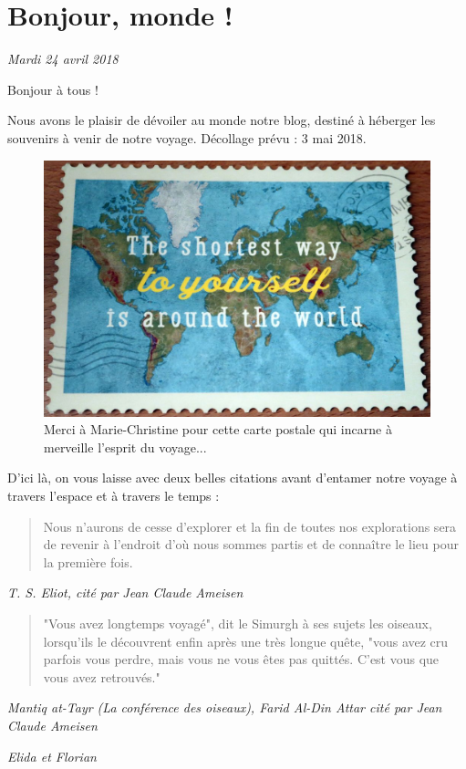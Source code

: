 \hypertarget{bonjour-monde}{%
\section{Bonjour, monde !}\label{bonjour-monde}}

\emph{Mardi 24 avril 2018}

Bonjour à tous !

Nous avons le plaisir de dévoiler au monde notre blog, destiné à
héberger les souvenirs à venir de notre voyage. Décollage prévu : 3 mai
2018.

\begin{figure}
\centering
\includegraphics{images/world_postcard.jpg}
\caption{Merci à Marie-Christine pour cette carte postale qui incarne à
merveille l'esprit du voyage...}
\end{figure}

D'ici là, on vous laisse avec deux belles citations avant d'entamer
notre voyage à travers l'espace et à travers le temps :

\begin{quote}
Nous n'aurons de cesse d'explorer et la fin de toutes nos explorations
sera de revenir à l'endroit d'où nous sommes partis et de connaître le
lieu pour la première fois.
\end{quote}

\emph{T. S. Eliot, cité par Jean Claude Ameisen}

\begin{quote}
"Vous avez longtemps voyagé", dit le Simurgh à ses sujets les oiseaux,
lorsqu'ils le découvrent enfin après une très longue quête, "vous avez
cru parfois vous perdre, mais vous ne vous êtes pas quittés. C'est vous
que vous avez retrouvés."
\end{quote}

\emph{Mantiq at-Tayr (La conférence des oiseaux), Farid Al-Din Attar cité par Jean Claude Ameisen}

\emph{Elida et Florian}

